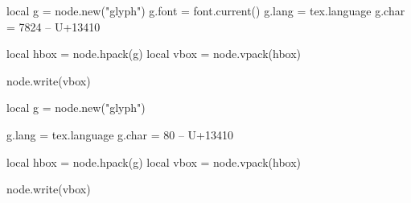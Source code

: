 \documentclass{article}
\begin{document}
\begin{luacode*}
local g = node.new("glyph")
g.font = font.current()
g.lang = tex.language
g.char = 7824 -- U+13410

local hbox = node.hpack(g)
local vbox = node.vpack(hbox)

node.write(vbox)
\end{luacode*}
\arial

\aegyptus
\par
\begin{luacode*}
local g = node.new("glyph")

g.lang = tex.language
g.char = 80 -- U+13410

local hbox = node.hpack(g)
local vbox = node.vpack(hbox)

node.write(vbox)
\end{luacode*}

\aegyptus

\end{document}
